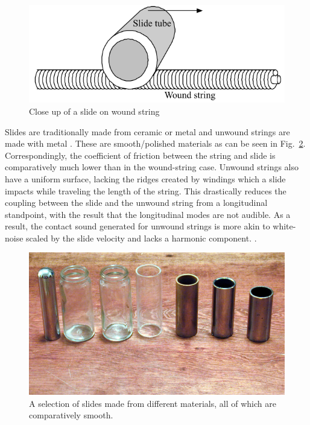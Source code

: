 \documentclass[../main.tex]{subfiles}
\begin{document}
\begin{figure}[h]
    \centering
    \includegraphics[scale=1]{./images/pictures/slide_wound_string_zoom.PNG}
    \caption{Close up of a slide on wound string }
    \label{fig:slide_string_zoom}
\end{figure}

Slides are traditionally made from ceramic or metal and unwound strings are made with metal . These are smooth/polished materials as can be seen in Fig.~\ref{fig:slide_types}. Correspondingly, the coefficient of friction between the string and slide is comparatively much lower than in the wound-string case. Unwound strings also have a uniform surface, lacking the ridges created by windings which a slide impacts while traveling the length of the string. This drastically reduces the coupling between the slide and the unwound string from a longitudinal standpoint, with the result that the longitudinal modes are not audible. As a result, the contact sound generated for unwound strings is more akin to white-noise scaled by the slide velocity and lacks a harmonic component. . 

\begin{figure}[h]
    \centering
    \includegraphics[scale=.35]{./images/pictures/Slide-guitar-different-slides-768x427.jpg}
    \caption{A selection of slides made from different materials, all of which are comparatively smooth.}
    \label{fig:slide_types}
\end{figure}
\end{document}
